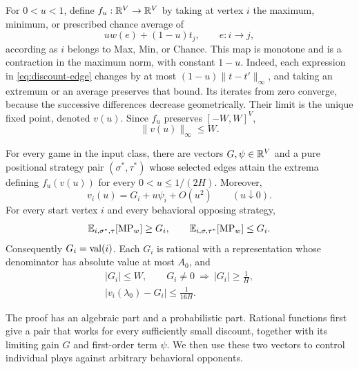 For $0<u<1$, define $f_u:\mathbb R^V\to\mathbb R^V$ by taking at vertex $i$ the
maximum, minimum, or prescribed chance average of
\begin{equation}
                 u w(e)+(1-u)t_j,
                 \qquad e:i\longrightarrow j,
\label{eq:discount-edge}
\end{equation}
according as $i$ belongs to Max, Min, or Chance. This map is monotone and
is a contraction in the maximum norm, with constant $1-u$. Indeed, each
expression in \eqref{eq:discount-edge} changes by at most
$(1-u)\|t-t'\|_\infty$, and taking an extremum or an average preserves
that bound. Its iterates from zero converge, because the successive
differences decrease geometrically. Their limit is the unique fixed
point, denoted $v(u)$. Since $f_u$ preserves $[-W,W]^V$,
\begin{equation}
                       \|v(u)\|_\infty\le W.
\label{eq:discount-bound}
\end{equation}

\begin{theorem}
\label{thm:discount}
For every game in the input class, there are vectors $G,\psi\in\mathbb R^V$
and a pure positional strategy pair $(\sigma^*,\tau^*)$ whose selected
edges attain the extrema defining $f_u(v(u))$ for every
$0<u\le1/(2H)$. Moreover,
\begin{equation}
                 v_i(u)=G_i+u\psi_i+O(u^2)
                 \qquad(u\downarrow0).
\label{eq:gain-bias-expansion}
\end{equation}
For every start vertex $i$ and every behavioral opposing strategy,
\begin{equation}
 \mathbb E_{i,\sigma^*,\tau}[\operatorname{MP}_w]\ge G_i,
 \qquad
 \mathbb E_{i,\sigma,\tau^*}[\operatorname{MP}_w]\le G_i.
\label{eq:gain-strategy-bounds}
\end{equation}
Consequently $G_i=\operatorname{val}(i)$. Each $G_i$ is rational with a representation
whose denominator has absolute value at most $A_0$, and
\begin{equation}
 \begin{gathered}
 |G_i|\le W,
 \qquad G_i\ne0\ \Longrightarrow\ |G_i|\ge\frac1H,\\
 |v_i(\lambda_0)-G_i|\le\frac1{16H}.
 \end{gathered}
\label{eq:discount-gap-error}
\end{equation}
\end{theorem}

The proof has an algebraic part and a probabilistic part. Rational
functions first give a pair that works for every sufficiently small
discount, together with its limiting gain $G$ and first-order term
$\psi$. We then use these two vectors to control individual plays
against arbitrary behavioral opponents.

